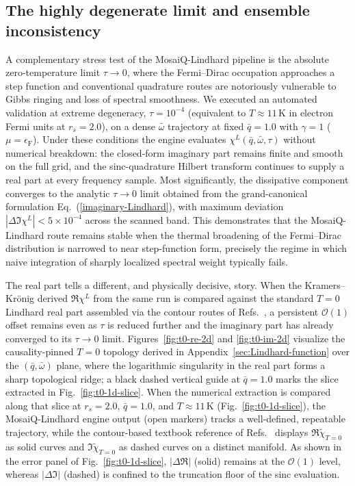 \documentclass[aps,showkeys,noshowpacs,superscriptaddress,pre,preprint]{revtex4-2}
\let\label\orilabel
\begin{document}
\subsection{The highly degenerate limit and ensemble inconsistency}
\label{sec:t0-limit-validation}

A complementary stress test of the MosaiQ-Lindhard pipeline is the absolute zero-temperature limit
$\tau \rightarrow 0$, where the Fermi--Dirac occupation approaches a step function
and conventional quadrature routes are notoriously vulnerable to Gibbs ringing
and loss of spectral smoothness.
We executed an automated validation at extreme degeneracy,
$\tau = 10^{-4}$ (equivalent to $T \approx 11\,\mathrm{K}$ in electron Fermi units at $r_s = 2.0$),
on a dense $\bar{\omega}$ trajectory at fixed $\bar{q} = 1.0$ with $\gamma = 1$ ($\mu = \epsilon_\mathrm{F}$).
Under these conditions the engine evaluates $\chi^L(\bar{q}, \bar{\omega}, \tau)$
without numerical breakdown: the closed-form imaginary part remains finite and smooth on the full grid,
and the sinc-quadrature Hilbert transform continues to supply a real part at every frequency sample.
Most significantly, the dissipative component converges to the analytic $\tau \rightarrow 0$ limit
obtained from the grand-canonical formulation Eq.~(\ref{imaginary-Lindhard}),
with maximum deviation $|\Delta \Im \chi^L| < 5 \times 10^{-4}$ across the scanned band.
This demonstrates that the MosaiQ-Lindhard route remains stable when the thermal broadening of the
Fermi--Dirac distribution is narrowed to near step-function form,
precisely the regime in which naive integration of sharply localized spectral weight typically fails.

The real part tells a different, and physically decisive, story.
When the Kramers--Kr\"onig derived $\Re \chi^L$ from the same run is compared against
the standard $T = 0$ Lindhard real part assembled via the contour routes of Refs.~\cite{Giuliani-Vignale2005,Gouedard-Deutsch1978},
a persistent $\mathcal{O}(1)$ offset remains even as $\tau$ is reduced further
and the imaginary part has already converged to its $\tau \rightarrow 0$ limit.
Figures~\ref{fig:t0-re-2d} and \ref{fig:t0-im-2d} visualize the causality-pinned $T=0$ topology derived in Appendix~\ref{sec:Lindhard-function} over the $(\bar{q}, \bar{\omega})$ plane, where the logarithmic singularity in the real part forms a sharp topological ridge; a black dashed vertical guide at $\bar{q}=1.0$ marks the slice extracted in Fig.~\ref{fig:t0-1d-slice}.
When the numerical extraction is compared along that slice at $r_s = 2.0$, $\bar{q} = 1.0$, and $T \approx 11\,\mathrm{K}$ (Fig.~\ref{fig:t0-1d-slice}), the MosaiQ-Lindhard engine output (open markers) tracks a well-defined, repeatable trajectory, while the contour-based textbook reference of Refs.~\cite{Giuliani-Vignale2005,Gouedard-Deutsch1978} displays $\Re \tilde{\chi}_{T=0}$ as solid curves and $\Im \tilde{\chi}_{T=0}$ as dashed curves on a distinct manifold.
As shown in the error panel of Fig.~\ref{fig:t0-1d-slice}, $|\Delta \Re|$ (solid) remains at the $\mathcal{O}(1)$ level, whereas $|\Delta \Im|$ (dashed) is confined to the truncation floor of the sinc evaluation.
\end{document}

